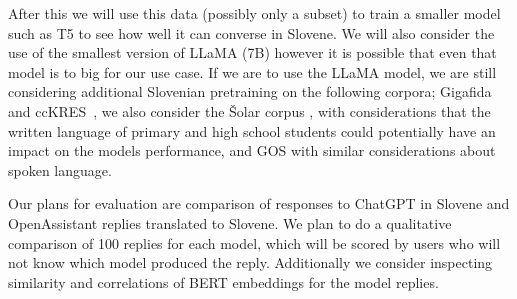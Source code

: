 \documentclass[fleqn,moreauthors,10pt]{ds_report}
\begin{document}
    
    After this we will use this data (possibly only a subset) to train a smaller model such as T5 to see how well it can converse in Slovene.
    We will also consider the use of the smallest version of LLaMA (7B) however it is possible that even that model is to big for our use case.
    If we are to use the LLaMA model, we are still considering additional Slovenian pretraining on the following corpora; Gigafida~\cite{11356/1320} and ccKRES~\cite{ccKres}, we also consider the Šolar corpus \cite{kosem2011slovenian}, with considerations that the written language of primary and high school students could potentially have an impact on the models performance, and GOS \cite{Verdonik2013} with similar considerations about spoken language.
    
    Our plans for evaluation are comparison of responses to ChatGPT in Slovene and OpenAssistant replies translated to Slovene. We plan to do a qualitative comparison of 100 replies for each model, which will be scored by users who will not know which model produced the reply.
    Additionally we consider inspecting similarity and correlations of BERT embeddings for the model replies.
    

    








\end{document}
